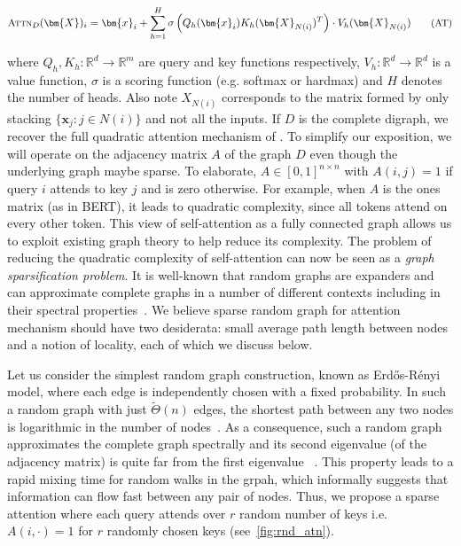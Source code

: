 \begin{equation}
\small
\ensuremath{\textsc{Attn}}_D({\bm{X}})_i = {\bm{x}}_i +  \sum_{h=1}^H \sigma \left(Q_h({\bm{x}}_i) K_h({\bm{X}}_{N(i)})^T \right) \cdot V_h({\bm{X}}_{N(i)}) 
\label{AT} \tag{AT}
\end{equation}

where $Q_h, K_h:\mathbb{R}^d \to \mathbb{R}^m$ are query and key functions respectively, $V_h:\mathbb{R}^d \to \mathbb{R}^d$ is a value function, $\sigma$ is a scoring function (e.g. softmax or hardmax) and $H$ denotes the number of heads. Also note $X_{N(i)}$ corresponds to the matrix formed by only stacking $\{{\bm{x}}_j : j\in N(i) \}$ and not all the inputs. If $D$ is the complete digraph, we recover the full quadratic attention mechanism of \citet{vaswani2017attention}. 
To simplify our exposition, we will operate on the adjacency matrix $A$ of the graph $D$  even though the underlying graph maybe sparse. To elaborate, $A \in [0, 1]^{n \times n}$ with $A(i,j)=1$ if query $i$ attends to key $j$ and is zero otherwise. For example, when $A$ is the ones matrix (as in BERT), it leads to quadratic complexity, since all tokens attend on every other token. This view of self-attention as a fully connected graph allows us to exploit existing graph theory to help reduce its complexity. The problem of reducing the quadratic complexity of self-attention can now be seen as a \emph{graph sparsification problem}. It is well-known that random graphs are expanders and can approximate complete graphs in a number of different contexts including in their spectral properties~\citep{spielman2011spectral,hoory2006expander}. We believe sparse random graph for attention mechanism should have two desiderata: small average path length between nodes and a notion of locality, each of which we discuss below.

Let us consider the simplest random graph construction, known as  Erd\H{o}s-R\'enyi model, where each edge is independently chosen with a fixed probability. In such a random graph with just $\tilde{\Theta}(n)$ edges, the shortest path between any two nodes is logarithmic in the number of nodes~\citep{chung2002average, katzav2018distribution}. As a consequence, such a random graph approximates the complete graph spectrally and its second eigenvalue (of the adjacency matrix) is quite far from the first eigenvalue ~\citep{benaych2019largest,benaych2020spectral,alt2019extremal}. This property leads to a rapid mixing time for random walks in the grpah, which informally suggests that information can flow fast between any pair of nodes. Thus, we propose a sparse attention where each query attends over $r$ random number of keys i.e. $A(i, \cdot ) = 1$ for $r$ randomly chosen keys (see~\ref{fig:rnd_atn}).

